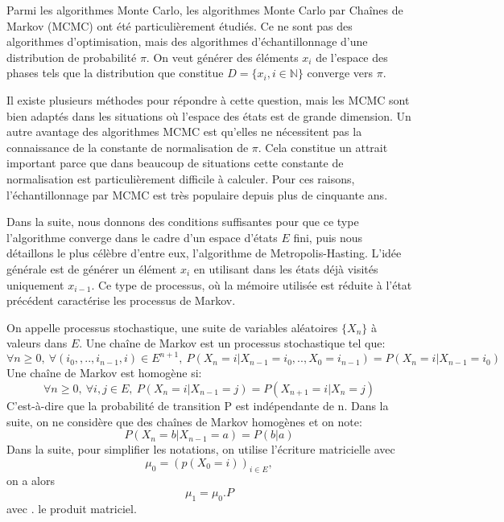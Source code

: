 Parmi les algorithmes Monte Carlo, les algorithmes Monte Carlo par Chaînes de Markov (MCMC) ont été particulièrement étudiés. Ce ne sont pas des algorithmes d'optimisation, mais des algorithmes d'échantillonnage d'une distribution de probabilité $\pi$. On veut générer des éléments $x_i$ de l'espace des phases tels que la distribution que constitue $D=\{x_i, i \in \mathbb{N} \}$ converge vers $\pi$.

Il existe plusieurs méthodes pour répondre à cette question, mais les MCMC sont bien adaptés dans les situations où l'espace des états est de grande dimension. Un autre avantage des algorithmes MCMC est qu'elles ne nécessitent pas la connaissance de la constante de normalisation de $\pi$. Cela constitue un attrait important parce que dans beaucoup de situations cette constante de normalisation est particulièrement difficile à calculer. Pour ces raisons, l'échantillonnage par MCMC est très populaire depuis plus de cinquante ans.

Dans la suite, nous donnons des conditions suffisantes pour que ce type l'algorithme converge dans le cadre d'un espace d'états $E$ fini, puis nous détaillons le plus célèbre d'entre eux, l'algorithme de Metropolis-Hasting. L'idée générale est de générer un élément $x_i$ en utilisant dans les états déjà visités uniquement $x_{i-1}$. Ce type de processus, où la mémoire utilisée est réduite à l'état précédent caractérise les processus de Markov.


On appelle processus stochastique, une suite de variables aléatoires $\{X_n\}$ à valeurs dans $E$.
Une chaîne de Markov est un processus stochastique tel que:\\
$$ \forall n \geqslant 0 ,\ \forall (i_0,,..,i_{n-1},i) \in E^{n+1},\  P(X_n=i|X_{n-1}=i_0,..,X_{0}=i_{n-1}) = P(X_n=i|X_{n-1}=i_0) $$
Une chaîne de Markov est homogène si:\\ 
\begin{displaymath}
  \label{eq_homog}
\forall n \geqslant 0 ,\ \forall i,j \in E,\ P(X_n=i|X_{n-1}=j)= P(X_{n+1}=i|X_n=j) 
\end{displaymath}
C'est-à-dire que la probabilité de transition P est indépendante de n. Dans la suite, on ne considère que des chaînes de Markov homogènes et on note:\\
$$P(X_n=b | X_{n-1}=a) = P(b|a)$$
Dans la suite, pour simplifier les notations, on utilise l'écriture matricielle avec \\
$$\mu_0 =(p(X_0=i))_{i \in E},$$
on a alors
$$\mu_1 =\mu_0 . P$$ avec . le produit matriciel.

